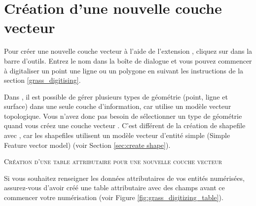 {%
\section{Création d'une nouvelle couche vecteur \grass}\label{sec:creating_new_grass_vectors}

Pour créer une nouvelle couche vecteur \grass à l'aide de l'extension \grass, cliquez sur  dans la barre d'outils. Entrez le nom dans la boîte de dialogue et vous pouvez commencer à digitaliser un point une ligne ou un polygone en suivant les instructions de la section \ref{grass_digitising}.

Dans \grass, il est possible de gérer plusieurs types de géométrie (point, ligne et surface) dans une seule couche d'information, car \grass utilise un modèle vecteur topologique. Vous n'avez donc pas besoin de sélectionner un type de géométrie quand vous créez une couche vecteur \grass. C'est différent de la création de shapefile avec \qg, car les shapefiles utilisent un modèle vecteur d'entité simple (Simple Feature vector model) (voir Section \ref{sec:create shape}).

\begin{Tip}\caption{\textsc{Création d'une table attributaire pour une nouvelle couche vecteur \grass}}
Si vous souhaitez renseigner les données attributaires de vos entités numérisées, assurez-vous d'avoir créé une table attributaire avec des champs avant ce commencer votre numérisation (voir Figure \ref{fig:grass_digitizing_table}).
\end{Tip}

}

